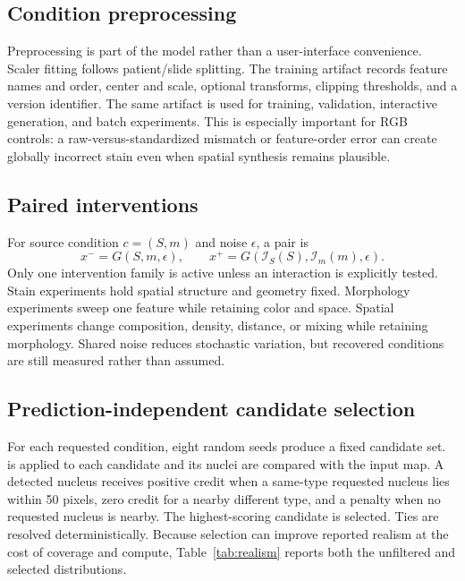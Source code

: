 \subsection{Condition preprocessing}

Preprocessing is part of the model rather than a user-interface convenience. Scaler fitting follows patient/slide splitting. The training artifact records feature names and order, center and scale, optional transforms, clipping thresholds, and a version identifier. The same artifact is used for training, validation, interactive generation, and batch experiments. This is especially important for RGB controls: a raw-versus-standardized mismatch or feature-order error can create globally incorrect stain even when spatial synthesis remains plausible.

\subsection{Paired interventions}

For source condition $c=(S,m)$ and noise $\epsilon$, a pair is
\begin{equation}
 x^- =G(S,m,\epsilon),\qquad
 x^+=G(\mathcal I_S(S),\mathcal I_m(m),\epsilon).
 \label{eq:counterfactual}
\end{equation}
Only one intervention family is active unless an interaction is explicitly tested. Stain experiments hold spatial structure and geometry fixed. Morphology experiments sweep one feature while retaining color and space. Spatial experiments change composition, density, distance, or mixing while retaining morphology. Shared noise reduces stochastic variation, but recovered conditions are still measured rather than assumed.

\subsection{Prediction-independent candidate selection}

For each requested condition, eight random seeds produce a fixed candidate set. \cellvit{} is applied to each candidate and its nuclei are compared with the input map. A detected nucleus receives positive credit when a same-type requested nucleus lies within 50 pixels, zero credit for a nearby different type, and a penalty when no requested nucleus is nearby. The highest-scoring candidate is selected. Ties are resolved deterministically. Because selection can improve reported realism at the cost of coverage and compute, Table~\ref{tab:realism} reports both the unfiltered and selected distributions.
